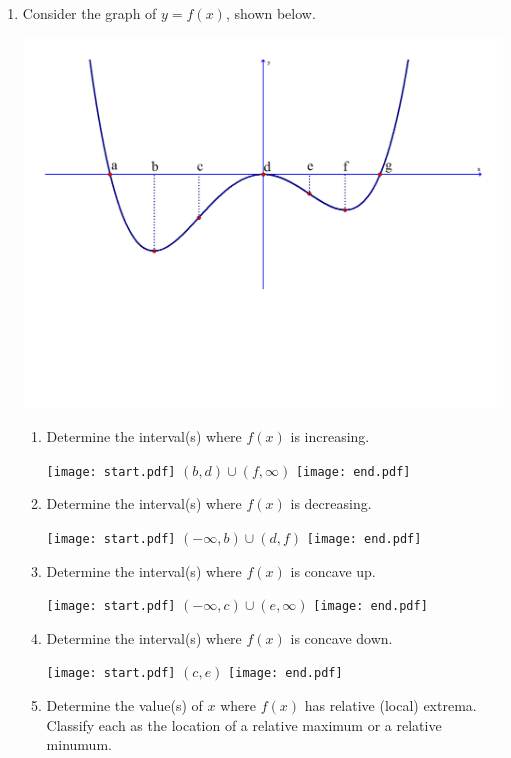 \documentclass[12pt]{article}
\begin{document}
\begin{enumerate}

\item Consider the graph of $y=f(x)$, shown below.

\begin{center}
\includegraphics[scale=0.5]{graph.pdf}
\end{center}

\begin{enumerate}

\item Determine the interval(s) where $f(x)$ is increasing.

\texttt{[image: start.pdf]}
{{$(b,d) \cup (f,\infty)$}}
\texttt{[image: end.pdf]}


\item Determine the interval(s) where $f(x)$ is decreasing.

\texttt{[image: start.pdf]}
{{$(-\infty,b) \cup (d,f)$}}
\texttt{[image: end.pdf]}


\item Determine the interval(s) where $f(x)$ is concave up.

\texttt{[image: start.pdf]}
{{$(-\infty,c) \cup (e,\infty)$}}
\texttt{[image: end.pdf]}


\item Determine the interval(s) where $f(x)$ is concave down.

\texttt{[image: start.pdf]}
{{$(c,e)$}}
\texttt{[image: end.pdf]}


\item Determine the value(s) of $x$ where $f(x)$ has relative (local) extrema.  Classify each as the location of a relative maximum or a relative minumum.


\end{enumerate}
\end{enumerate}
\end{document}
